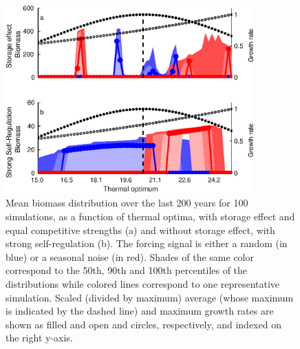 \documentclass[a4paper,12pt]{article}
\begin{document}
\begin{figure}[!ht]
\begin{centering}
\includegraphics[bb=0bp 0bp 428bp 338bp,width=0.85\textwidth]{Fig4}
\par\end{centering}
\caption{Mean biomass distribution over the last 200 years for 100 simulations,
as a function of thermal optima, with storage effect and equal competitive
strengths (a) and without storage effect, with strong self-regulation
(b). The forcing signal is either a random (in blue) or a seasonal
noise (in red). Shades of the same color correspond to the 50th, 90th
and 100th percentiles of the distributions while colored lines correspond
to one representative simulation. Scaled (divided by maximum) average
(whose maximum is indicated by the dashed line) and maximum growth
rates are shown as filled and open and circles, respectively, and
indexed on the right y-axis. \label{fig:Unstable_cases}}
\end{figure}
\end{document}
